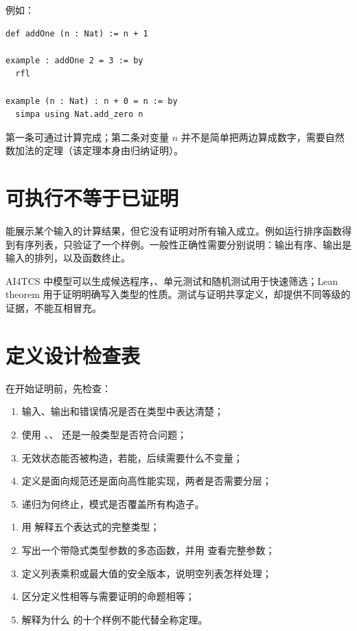 例如：
\begin{lstlisting}
def addOne (n : Nat) := n + 1

example : addOne 2 = 3 := by
  rfl

example (n : Nat) : n + 0 = n := by
  simpa using Nat.add_zero n
\end{lstlisting}
第一条可通过计算完成；第二条对变量 $n$ 并不是简单把两边算成数字，需要自然数加法的定理（该定理本身由归纳证明）。

\section{可执行不等于已证明}

 能展示某个输入的计算结果，但它没有证明对所有输入成立。例如运行排序函数得到有序列表，只验证了一个样例。一般性正确性需要分别说明：输出有序、输出是输入的排列，以及函数终止。

\begin{aibox}
AI4TCS 中模型可以生成候选程序，、单元测试和随机测试用于快速筛选；Lean theorem 用于证明明确写入类型的性质。测试与证明共享定义，却提供不同等级的证据，不能互相冒充。
\end{aibox}

\section{定义设计检查表}

在开始证明前，先检查：
\begin{enumerate}
  \item 输入、输出和错误情况是否在类型中表达清楚；
  \item 使用 、、 还是一般类型是否符合问题；
  \item 无效状态能否被构造，若能，后续需要什么不变量；
  \item 定义是面向规范还是面向高性能实现，两者是否需要分层；
  \item 递归为何终止，模式是否覆盖所有构造子。
\end{enumerate}

\begin{checkpointbox}
\begin{enumerate}
  \item 用  解释五个表达式的完整类型；
  \item 写出一个带隐式类型参数的多态函数，并用  查看完整参数；
  \item 定义列表乘积或最大值的安全版本，说明空列表怎样处理；
  \item 区分定义性相等与需要证明的命题相等；
  \item 解释为什么  的十个样例不能代替全称定理。
\end{enumerate}
\end{checkpointbox}
